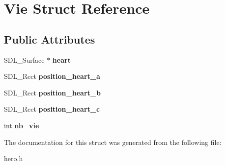\hypertarget{structVie}{}\section{Vie Struct Reference}
\label{structVie}
\subsection*{Public Attributes}
\begin{DoxyCompactItemize}
\item 
\mbox{\label{structVie_a2656effa8772d33fe9d4d52212db99dc}} 
S\+D\+L\+\_\+\+Surface $\ast$ {\bfseries heart}
\item 
\mbox{\label{structVie_a7076ab45d1bad6fef6159b35d8056109}} 
S\+D\+L\+\_\+\+Rect {\bfseries position\+\_\+heart\+\_\+a}
\item 
\mbox{\label{structVie_ac0fc02d542c34723253eeca8cf4b8125}} 
S\+D\+L\+\_\+\+Rect {\bfseries position\+\_\+heart\+\_\+b}
\item 
\mbox{\label{structVie_a0398326a6888247e76c1669bf2cd9d11}} 
S\+D\+L\+\_\+\+Rect {\bfseries position\+\_\+heart\+\_\+c}
\item 
\mbox{\label{structVie_a133255bdd7e91d9c2d90eaf71239540d}} 
int {\bfseries nb\+\_\+vie}
\end{DoxyCompactItemize}


The documentation for this struct was generated from the following file\+:\begin{DoxyCompactItemize}
\item 
hero.\+h\end{DoxyCompactItemize}
